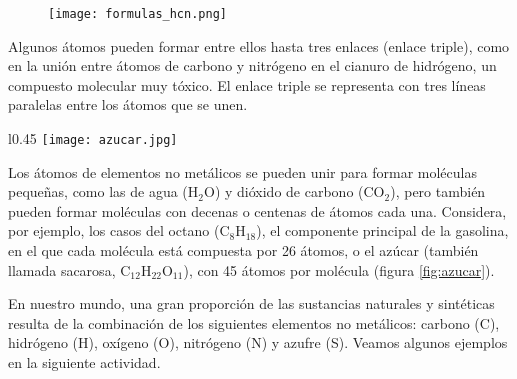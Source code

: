\begin{figure}[H]
    \centering
    \texttt{[image: formulas\_hcn.png]}
    \label{fig:formulas_hcn}
\end{figure}

Algunos átomos pueden formar entre ellos hasta tres enlaces (enlace triple),
como en la unión entre átomos de carbono y nitrógeno en el cianuro de hidrógeno,
un compuesto molecular muy tóxico. El enlace triple se representa con tres líneas
paralelas entre los átomos que se unen.

\begin{wrapfigure}{l}{0.45\textwidth}
    \centering
    \texttt{[image: azucar.jpg]}
    \label{fig:azucar}
\end{wrapfigure}

Los átomos de elementos no metálicos se pueden unir para formar moléculas pequeñas,
como las de agua (H$_2$O) y dióxido de carbono (CO$_2$), pero también pueden formar moléculas con
decenas o centenas de átomos cada una. Considera, por ejemplo, los casos del octano (C$_8$H$_{18}$),
el componente principal de la gasolina, en el que cada molécula está compuesta por 26 átomos,
o el azúcar (también llamada sacarosa, C$_{12}$H$_{22}$O$_{11}$), con 45 átomos por molécula (figura \ref{fig:azucar}).

En nuestro mundo, una gran proporción de las sustancias naturales y sintéticas resulta de la
combinación de los siguientes elementos no metálicos: carbono (C), hidrógeno (H), oxígeno (O), nitrógeno
(N) y azufre (S). Veamos algunos ejemplos en la siguiente actividad.

